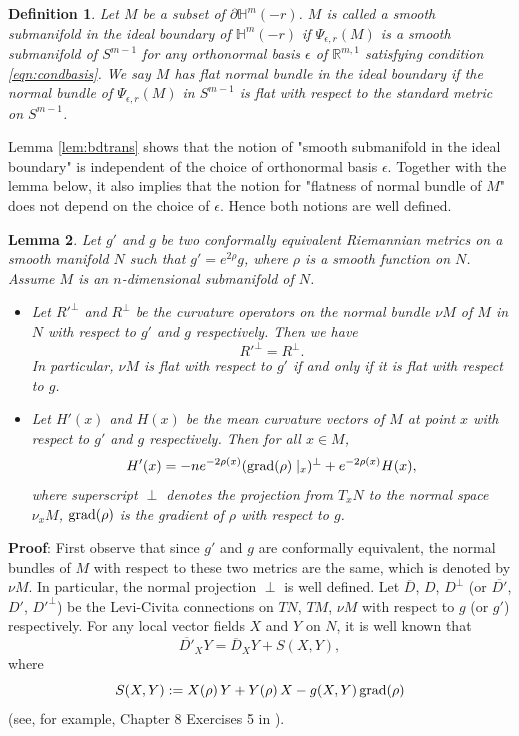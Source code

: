 \documentclass[12pt]{article}
\newtheorem{lem}{Lemma}[section]
\newtheorem{defi}[lem]{Definition}
\begin{document}
\begin{defi} \label{def:SubmBD}
Let $M$ be a subset of $\partial \mathbb{H}^m(-r)$. $M$ is called a smooth submanifold in the ideal boundary
of $\mathbb{H}^m(-r)$ if $\Psi_{\epsilon, r}(M)$ is a smooth submanifold of $S^{m-1}$ for any
orthonormal basis $\epsilon$ of $\mathbb{R}^{m,1}$ satisfying condition \eqref{eqn:condbasis}.
We say $M$ has flat normal bundle in the ideal boundary if
the normal bundle of  $\Psi_{\epsilon, r}(M)$ in $S^{m-1}$ is flat with respect to the standard metric on $S^{m-1}$.
\end{defi}
Lemma \ref{lem:bdtrans} shows that the notion of "smooth submanifold in the ideal boundary" is independent
of the choice of orthonormal basis $\epsilon$. Together with the lemma below, it also implies that
the notion for
"flatness of normal bundle of $M$"  does not depend on the choice of $\epsilon$.
Hence both notions are well defined.

\begin{lem}\label{flat}
Let $g'$ and $g$ be two conformally equivalent Riemannian metrics on a smooth manifold $N$
such that $g' =e^{2\rho}g$, where $\rho$ is a smooth function on $N$.
Assume $M$ is an $n$-dimensional submanifold of $N$.
\begin{itemize}
\item[(1)] Let  $R'^{\perp}$ and $R^{\perp}$ be the curvature operators on the normal bundle $\nu M$ of $M$ in $N$
with respect to $g'$ and $g$ respectively. Then we have
\[ R'^{\perp}=R^{\perp}.\]
In particular, $\nu M$ is flat with respect to $g'$ if and only if
it is flat with respect to $g$.

\item[(2)]  Let $H'(x)$ and $H(x)$ be the mean curvature vectors of $M$ at point $x$ with respect to $g'$ and $g$ respectively.
Then for all $x\in M$,
\[ H'(x)=-ne^{-2\rho(x)}({\rm grad} (\rho) \mid_x)^{\perp}+e^{-2\rho(x)}H(x), \]
 where superscript $\perp$ denotes the projection from $T_x N$ to the normal space $\nu_x M$,
 ${\rm grad}(\rho)$ is the gradient of $\rho$ with respect to $g$.
\end{itemize}
\end{lem}
\noindent
{\bf Proof}:
First observe that since $g'$ and $g$ are conformally equivalent, the normal bundles of $M$ with respect to these two metrics are the same, which is denoted by $\nu M$. In particular, the normal projection $\perp$ is well defined.
Let  $\overline D$, $D$, $D^{\perp}$  (or $\overline{D'}$, $D'$, $D'^{\perp}$) be the Levi-Civita connections on $TN$, $TM$, $\nu M$ with respect to $g$ (or $g'$) respectively. For any local vector fields $X$ and $Y$ on $N$, it is well known that
\begin{equation} \label{eqn:connconf}
\overline{D'}_X Y = \overline{D}_X Y + S(X,Y),
\end{equation}
where
\begin{equation} \label{eqn:S}
 S(X,Y) := X(\rho) \, Y+Y(\rho) \, X - g(X,Y) \, {\rm grad}(\rho)
\end{equation}
(see, for example, Chapter 8 Exercises 5 in \cite{d.C}).
\end{document}
